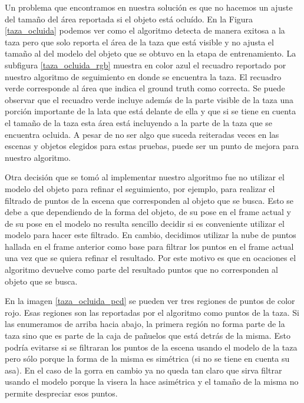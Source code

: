 Un problema que encontramos en nuestra solución es que no hacemos un ajuste del tamaño del área reportada si el objeto está ocluído. En la Figura \ref{taza_ocluida} podemos ver como el algoritmo detecta de manera exitosa a la taza pero que solo reporta el área de la taza que está visible y no ajusta el tamaño al del modelo del objeto que se obtuvo en la etapa de entrenamiento. La subfigura \ref{taza_ocluida_rgb} muestra en color azul el recuadro reportado por nuestro algoritmo de seguimiento en donde se encuentra la taza. El recuadro verde corresponde al área que indica el ground truth como correcta. Se puede observar que el recuadro verde incluye además de la parte visible de la taza una porción importante de la lata que está delante de ella y que si se tiene en cuenta el tamaño de la taza esta área está incluyendo a la parte de la taza que se encuentra ocluida. A pesar de no ser algo que suceda reiteradas veces en las escenas y objetos elegidos para estas pruebas, puede ser un punto de mejora para nuestro algoritmo. 

Otra decisión que se tomó al implementar nuestro algoritmo fue no utilizar el modelo del objeto para refinar el seguimiento, por ejemplo, para realizar el filtrado de puntos de la escena que corresponden al objeto que se busca. Esto se debe a que dependiendo de la forma del objeto, de su pose en el frame actual y de su pose en el modelo no resulta sencillo decidir si es conveniente utilizar el modelo para hacer este filtrado. En cambio, decidimos utilizar la nube de puntos hallada en el frame anterior como base para filtrar los puntos en el frame actual una vez que se quiera refinar el resultado. Por este motivo es que en ocaciones el algoritmo devuelve como parte del resultado puntos que no corresponden al objeto que se busca.

En la imagen \ref{taza_ocluida_pcd} se pueden ver tres regiones de puntos de color rojo. Esas regiones son las reportadas por el algoritmo como puntos de la taza. Si las enumeramos de arriba hacia abajo, la primera región no forma parte de la taza sino que es parte de la caja de pañuelos que está detrás de la misma. Esto podría evitarse si se filtraran los puntos de la escena usando el modelo de la taza pero sólo porque la forma de la misma es simétrica (si no se tiene en cuenta su asa). En el caso de la gorra en cambio ya no queda tan claro que sirva filtrar usando el modelo porque la visera la hace asimétrica y el tamaño de la misma no permite despreciar esos puntos.

